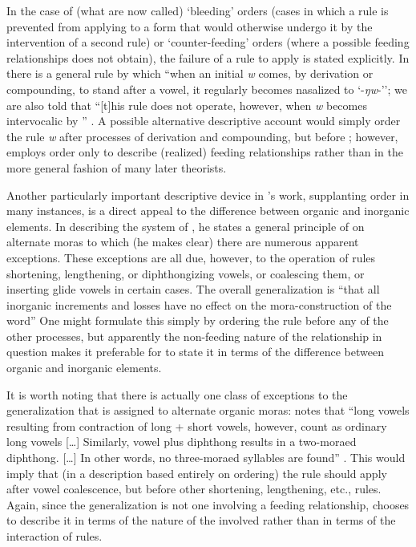 In the case of (what are now called) `bleeding' orders (cases in which
a rule is prevented from applying to a form that would otherwise
undergo it by the intervention of a second rule) or `counter-feeding'
orders (where a possible feeding relationships does not obtain), the
failure of a rule to apply is stated explicitly. In 
there is a general rule by which ``when an initial \emph{w} comes, by
derivation or compounding, to stand after a vowel, it regularly
becomes nasalized to `-\emph{ŋw}-''; we are also told that ``[t]his
rule does not operate, however, when \emph{w} becomes intervocalic by
'' \citep[49]{sapir30:s.paiute}. A possible alternative
descriptive account would simply order the rule  \emph{w}
after processes of derivation and compounding, but before
; however, {\Sapir} employs order only to describe
(realized) feeding relationships rather than in the more general
fashion of many later theorists.

Another particularly important descriptive device in {\Sapir}'s work,
supplanting order in many instances, is a direct appeal to the
difference between organic and inorganic elements. In describing the
 system of , he states a general principle of
 on alternate moras to which (he makes clear) there are numerous
apparent exceptions. These exceptions are all due, however, to the
operation of rules shortening, lengthening, or diphthongizing vowels,
or coalescing them, or inserting glide vowels in certain cases. The
overall generalization is ``that all inorganic increments and losses
have no effect on the mora-construction of the word''
\citep[38]{sapir30:s.paiute} One might formulate this simply by
ordering the  rule before any of the other processes, but
apparently the non-feeding nature of the relationship in question
makes it preferable for {\Sapir} to state it in terms of the difference
between organic and inorganic elements.

It is worth noting that there is actually one class of exceptions to
the generalization that  is assigned to alternate organic moras:
{\Sapir} notes that ``long vowels resulting from contraction of long +
short vowels, however, count as ordinary long vowels [\ldots]
Similarly, vowel plus diphthong results in a two-moraed
diphthong. [\ldots] In other words, no three-moraed syllables are
found'' \citep[38]{sapir30:s.paiute}. This would imply that (in a
description based entirely on ordering) the  rule should apply
after vowel coalescence, but before other shortening, lengthening,
etc., rules. Again, since the generalization is not one involving a
feeding relationship, {\Sapir} chooses to describe it in terms of the
nature of the  involved rather than in terms of the
interaction of rules.

